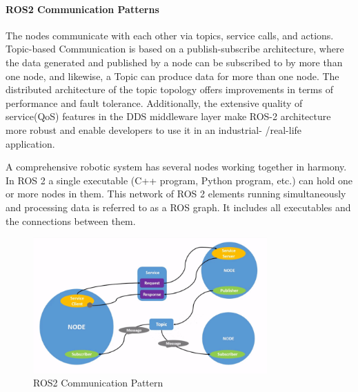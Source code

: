 	\paragraph[ROS2]{ROS2 Communication Patterns}
	\label{Grundlagen:ROS2:CommunicationPatterns}

	The nodes communicate with each other via topics, service calls, and actions. Topic-based Communication is based on a publish-subscribe architecture, where the data generated and published by a node can be subscribed to by more than one node, and likewise, a Topic can produce data for more than one node. 
	The distributed architecture of the topic topology offers improvements in terms of performance and fault tolerance. Additionally, the extensive quality of service(QoS) features in the DDS middleware layer make ROS-2 architecture more robust and enable developers to use it in an industrial- /real-life application.

	A comprehensive robotic system has several nodes working together in harmony. In ROS 2 a single executable (C++ program, Python program, etc.) can hold one or more nodes in them. This network of ROS 2 elements running simultaneously and processing data is referred to as a ROS graph. It includes all executables and the connections between them.



	\begin{figure}[H]
		\centering
		\includegraphics[width=0.8\textwidth]{"Bilder/ros-nodes.png"}
		\caption{ROS2 Communication Pattern \cite{ros2Basic}}
		\label{fig:Background:Ros2Nodes}					
	\end{figure}

